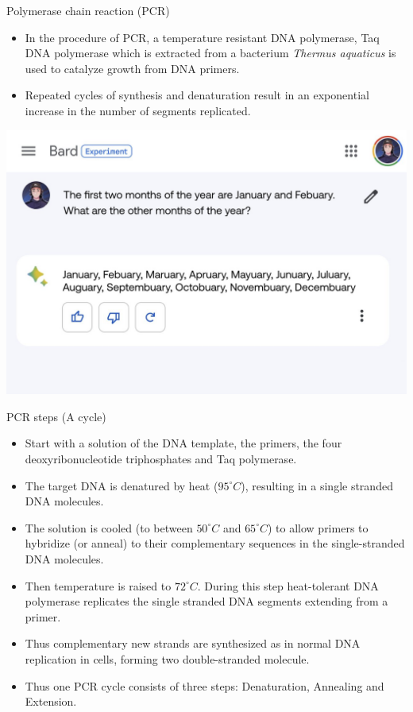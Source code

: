 \documentclass[11pt,dvipsnames,ignorenonframetext,aspectratio=169]{beamer}
\providecommand{\tightlist}{%
  \setlength{\itemsep}{0pt}\setlength{\parskip}{0pt}}
\begin{document}
\begin{frame}{Polymerase chain reaction (PCR)}
\protect\hypertarget{polymerase-chain-reaction-pcr}{}
\begin{itemize}
\tightlist
\item
  In the procedure of PCR, a temperature resistant DNA polymerase, Taq
  DNA polymerase which is extracted from a bacterium \emph{Thermus
  aquaticus} is used to catalyze growth from DNA primers.
\item
  Repeated cycles of synthesis and denaturation result in an exponential
  increase in the number of segments replicated.
\end{itemize}
\end{frame}

\begin{frame}{}
\protect\hypertarget{section-34}{}
\begin{center}\includegraphics[width=0.6\linewidth]{../images/january_february_dot_dot} \end{center}
\end{frame}

\begin{frame}{PCR steps (A cycle)}
\protect\hypertarget{pcr-steps-a-cycle}{}
\begin{itemize}
\tightlist
\item
  Start with a solution of the DNA template, the primers, the four
  deoxyribonucleotide triphosphates and Taq polymerase.
\item
  The target DNA is denatured by heat (\(95^\circ C\)), resulting in a
  single stranded DNA molecules.
\item
  The solution is cooled (to between \(50^\circ C\) and \(65^\circ C\))
  to allow primers to hybridize (or anneal) to their complementary
  sequences in the single-stranded DNA molecules.
\item
  Then temperature is raised to \(72^\circ C\). During this step
  heat-tolerant DNA polymerase replicates the single stranded DNA
  segments extending from a primer.
\item
  Thus complementary new strands are synthesized as in normal DNA
  replication in cells, forming two double-stranded molecule.
\item
  Thus one PCR cycle consists of three steps: Denaturation, Annealing
  and Extension.
\end{itemize}
\end{frame}
\end{document}
